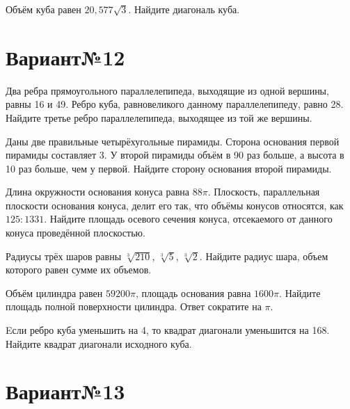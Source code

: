 \documentclass[4apaper]{article}
\begin{document}
\begin{taskBN}{6}
Объём куба равен $20,577\sqrt{3}$. Найдите диагональ куба.
\end{taskBN}
\newpage\section*{Вариант№12}

\begin{taskBN}{1}
Два ребра прямоугольного параллелепипеда, выходящие из одной вершины, равны 16 и 49. Ребро куба, равновеликого данному параллелепипеду, равно 28. Найдите третье ребро параллелепипеда, выходящее из той же вершины.
\end{taskBN}

\begin{taskBN}{2}
Даны две правильные четырёхугольные пирамиды. Сторона основания первой пирамиды составляет 3. У второй пирамиды объём в 90 раз больше, а высота в 10 раз больше, чем у первой. Найдите сторону основания второй пирамиды.
\end{taskBN}

\begin{taskBN}{3}
Длина окружности основания конуса равна $88\pi$. Плоскость, параллельная плоскости основания конуса,  делит его так, что объёмы конусов относятся, как $125:1331$. Найдите площадь осевого сечения конуса, отсекаемого от данного конуса проведённой плоскостью. 
\end{taskBN}

\begin{taskBN}{4}
Радиусы трёх шаров равны $\sqrt[3]{210}$, $\sqrt[3]{5}$, $\sqrt[3]{2}$. Найдите радиус шара, объем которого равен сумме их объемов.
\end{taskBN}

\begin{taskBN}{5}
Объём цилиндра равен $59200\pi$, площадь основания равна $1600\pi$. Найдите площадь полной поверхности цилиндра. Ответ сократите на $\pi$.
\end{taskBN}

\begin{taskBN}{6}
Eсли ребро куба уменьшить на 4, то квадрат диагонали уменьшится на 168. Найдите квадрат диагонали исходного куба.
\end{taskBN}
\newpage\section*{Вариант№13}
\end{document}
